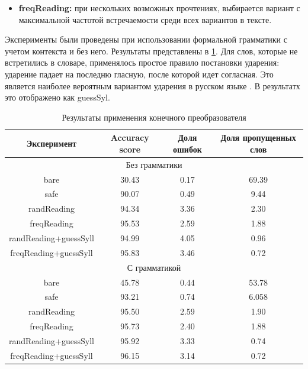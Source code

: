 \documentclass[14pt, a4paper, russian]{report}
\begin{document}
\begin{normalsize}
\begin{itemize}
	\item \textbf{freqReading:} при нескольких возможных прочтениях, выбирается вариант с максимальной  частотой встречаемости среди всех  вариантов в тексте.
\end{itemize}


Эксперименты были проведены при использовании формальной грамматики с учетом контекста и без него. Результаты представлены в \cref{table:final_state_result}. Для слов, которые не встретились в словаре, применялось простое правило постановки ударения: ударение падает на последню гласную, после которой идет согласная. Это является наиболее вероятным вариантом ударения в русском языке \cite{lavitskaya}. В результатх это отображено как guessSyl.

\begin{table}[H]
	\caption{Результаты применения конечного преобразователя}
	
	\begin{small}
		\begin{center}
			\begin{tabular}{|c|c|c|c|}
				\hline
				Эксперимент & Accuracy score & Доля ошибок & Доля пропущенных слов\\
				\hline
				\multicolumn{4}{|c|}{Без грамматики} \\			
				\hline
				bare & 30.43 & 0.17 & 69.39 \\
				\hline
				safe & 90.07 & 0.49 & 9.44 \\
				\hline
				randReading &94.34 &3.36 &2.30 \\
				\hline
				freqReading &95.53 &2.59& 1.88 \\
				\hline
				randReading+guessSyll &94.99 &4.05 &0.96 \\
				\hline
				freqReading+guessSyll & 95.83 &3.46 &0.72\\
				\hline
				\multicolumn{4}{|c|}{С грамматикой} \\			
				\hline
				bare &45.78 & 0.44 &53.78\\
				\hline
				safe &93.21& 0.74 &6.058 \\
				\hline
				randReading &95.50 &2.59 &1.90 \\
				\hline
				freqReading &95.73 &2.40 &1.88 \\
				\hline
				randReading+guessSyll &95.92 &3.33 &0.74 \\
				\hline
				freqReading+guessSyll &96.15 &3.14 &0.72 \\
				\hline
				
			\end{tabular}
		\end{center}
	\end{small}
	\label{table:final_state_result}
	

\end{table}
\end{normalsize}
\end{document}

